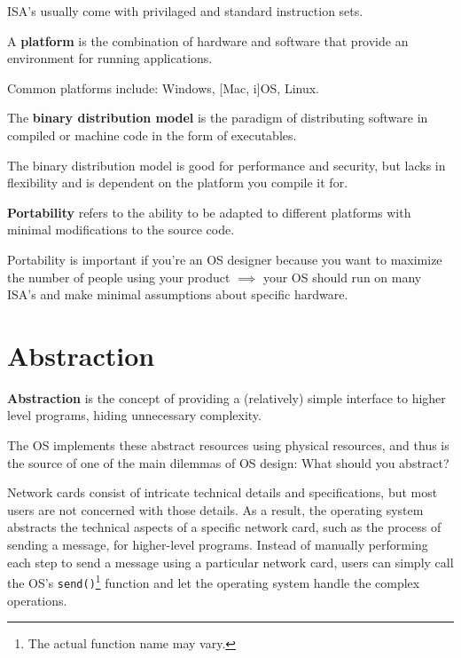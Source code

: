 \documentclass{article}
\begin{document}
ISA's usually come with privilaged and standard instruction sets.

\begin{tcolorbox}[title=Definition: Platform]
  A \textbf{platform} is the combination of hardware and software that provide an environment for
  running applications.
\end{tcolorbox}

Common platforms include: Windows, [Mac, i]OS, Linux.

\begin{tcolorbox}[title=Definition: Binary Distribution Model]
  The \textbf{binary distribution model} is the paradigm of distributing software in compiled or
  machine code in the form of executables.
\end{tcolorbox}

The binary distribution model is good for performance and security, but lacks in flexibility and is
dependent on the platform you compile it for.

\begin{tcolorbox}[title=Definition: Binary Distribution Model]
  \textbf{Portability} refers to the ability to be adapted to different platforms with minimal
  modifications to the source code.
\end{tcolorbox}

Portability is important if you're an OS designer because you want to maximize the number of people
using your product $\implies$ your OS should run on many ISA's and make minimal assumptions about
specific hardware.





\section{Abstraction}
\begin{tcolorbox}[title=Definition: Abstraction]
  \textbf{Abstraction} is the concept of providing a (relatively) simple interface to higher level
  programs, hiding unnecessary complexity.
\end{tcolorbox}

The OS implements these abstract resources using physical resources, and thus is the source of one
of the main dilemmas of OS design: What should you abstract?

\begin{tcolorbox}[colback=blue!5!white,colframe=black!75!blue,title=Example: Network Neverland]
  Network cards consist of intricate technical details and specifications, but most users are not
  concerned with those details. As a result, the operating system abstracts the technical aspects of a
  specific network card, such as the process of sending a message, for higher-level programs. Instead
  of manually performing each step to send a message using a particular network card, users can simply
  call the OS's \texttt{send()}\footnote{The actual function name may vary.} function and let the
  operating system handle the complex operations. 
\end{tcolorbox}
\end{document}
